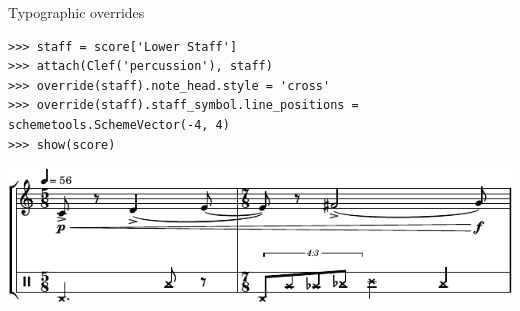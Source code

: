 \begin{frame}[fragile]{Typographic overrides}

\begin{abjadbookoutput}
\begin{singlespacing}
\vspace{-0.5\baselineskip}
\begin{verbatim}
>>> staff = score['Lower Staff']
>>> attach(Clef('percussion'), staff)
>>> override(staff).note_head.style = 'cross'
>>> override(staff).staff_symbol.line_positions = schemetools.SchemeVector(-4, 4)
>>> show(score)
\end{verbatim}
\noindent\includegraphics[max width=\textwidth,]{assets/lilypond-5b7ae10d9fb4a5038821f2f69bee511d.pdf}
\end{singlespacing}
\end{abjadbookoutput}

\end{frame}


